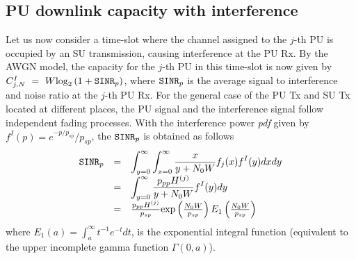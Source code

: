 \subsection{PU downlink capacity with interference}
Let us now consider a time-slot where the channel assigned to the $j$-th PU is occupied by an SU transmission, causing interference at the PU Rx.
By the AWGN model, the capacity for the $j$-th PU in this time-slot is now given by $C^{I}_{j,N}~=~W\text{log}_{2}\left(1+\text{\ttfamily{SINR}}_{p}\right)$, where $\text{\ttfamily{SINR}}_{p}$ is the average signal to interference and noise ratio at the $j$-th PU Rx.
For the general case of the PU Tx and SU Tx located at different places, the PU signal and the interference signal follow independent fading processes. 
With the interference power \textit{pdf} given by $f^{I}(p)=e^{-p/p_{sp}}/p_{sp}$, the $\text{\ttfamily{SINR}}_{p}$ is obtained as follows
\begin{equation}\label{SINRp}
\begin{array}{lcl}
\text{\ttfamily{SINR}}_{p} & = & \displaystyle\int_{y=0}^{\infty}\displaystyle\int_{x=0}^{\infty}
\displaystyle\frac{x}{y+N_{0}W}f_{j}(x)f^{I}(y)dxdy \\
& = & \displaystyle\int_{y=0}^{\infty}\displaystyle\frac{p_{pp}H^{(j)}}{y + N_{0}W}f^{I}(y)dy \\
& = & \frac{p_{pp}H^{(j)}}{p_{sp}}\text{exp}\left(\frac{N_{0}W}{p_{sp}}\right)E_{1}\left(\frac{N_{0}W}{p_{sp}}\right)
\end{array}
\end{equation}
where $E_{1}(a)=\int_{a}^{\infty}t^{-1}e^{-t} dt$, is the exponential integral function (equivalent to the upper incomplete gamma function $\Gamma(0,a)$).

